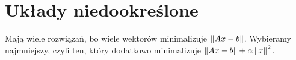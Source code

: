 \section{Układy niedookreślone}
Mają wiele rozwiązań, bo wiele wektorów minimalizuje \( \left\Vert Ax - b \right\Vert \). Wybieramy najmniejszy, czyli ten, który dodatkowo minimalizuje \( \left\Vert Ax - b \right\Vert  + \alpha\left\Vert x \right\Vert^2 \).